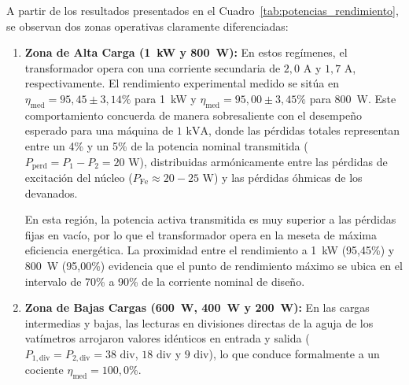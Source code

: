 A partir de los resultados presentados en el Cuadro~\ref{tab:potencias_rendimiento}, se observan dos zonas operativas claramente diferenciadas:
\begin{enumerate}
    \item \textbf{Zona de Alta Carga (1~kW y 800~W):}
    En estos regímenes, el transformador opera con una corriente secundaria de $2{,}0\text{ A}$ y $1{,}7\text{ A}$, respectivamente. El rendimiento experimental medido se sitúa en $\eta_{\text{med}} = 95{,}45 \pm 3{,}14\%$ para 1~kW y $\eta_{\text{med}} = 95{,}00 \pm 3{,}45\%$ para 800~W. Este comportamiento concuerda de manera sobresaliente con el desempeño esperado para una máquina de $1\text{ kVA}$, donde las pérdidas totales representan entre un 4\% y un 5\% de la potencia nominal transmitida ($P_{\text{perd}} = P_1 - P_2 = 20\text{ W}$), distribuidas armónicamente entre las pérdidas de excitación del núcleo ($P_{\text{Fe}} \approx 20 - 25\text{ W}$) y las pérdidas óhmicas de los devanados.
    
    En esta región, la potencia activa transmitida es muy superior a las pérdidas fijas en vacío, por lo que el transformador opera en la meseta de máxima eficiencia energética. La proximidad entre el rendimiento a 1~kW (95,45\%) y 800~W (95,00\%) evidencia que el punto de rendimiento máximo se ubica en el intervalo de 70\% a 90\% de la corriente nominal de diseño.

    \item \textbf{Zona de Bajas Cargas (600~W, 400~W y 200~W):}
    En las cargas intermedias y bajas, las lecturas en divisiones directas de la aguja de los vatímetros arrojaron valores idénticos en entrada y salida ($P_{1,\text{div}} = P_{2,\text{div}} = 38\text{ div}$, $18\text{ div}$ y $9\text{ div}$), lo que conduce formalmente a un cociente $\eta_{\text{med}} = 100{,}0\%$. 
    

\end{enumerate}
